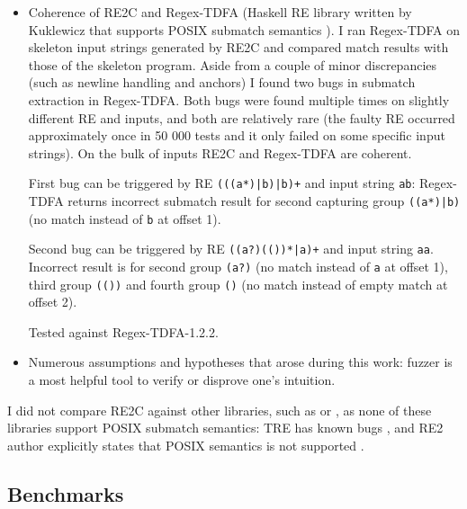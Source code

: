 \documentclass{article}
\theoremstyle{definition}
\begin{document}
\begin{multicols}{2}
\begin{itemize}
    \item Coherence of RE2C and Regex-TDFA (Haskell RE library written by Kuklewicz that supports POSIX submatch semantics \cite{Regex-TDFA}).
        I ran Regex-TDFA on skeleton input strings generated by RE2C and compared match results with those of the skeleton program.
        Aside from a couple of minor discrepancies (such as newline handling and anchors)
        I found two bugs in submatch extraction in Regex-TDFA.
        Both bugs were found multiple times on slightly different RE and inputs,
        and both are relatively rare (the faulty RE occurred approximately once in 50 000 tests
        and it only failed on some specific input strings).
        On the bulk of inputs RE2C and Regex-TDFA are coherent.

        First bug can be triggered by RE \texttt{(((a*)|b)|b)+} and input string \texttt{ab}:
        Regex-TDFA returns incorrect submatch result for second capturing group \texttt{((a*)|b)}
        (no match instead of \texttt{b} at offset 1).

        Second bug can be triggered by RE \texttt{((a?)(())*|a)+} and input string \texttt{aa}.
        Incorrect result is for second group \texttt{(a?)} (no match instead of \texttt{a} at offset 1),
        third group \texttt{(())} and fourth group \texttt{()} (no match instead of empty match at offset 2).

        Tested against Regex-TDFA-1.2.2.

    \item Numerous assumptions and hypotheses that arose during this work:
        fuzzer is a most helpful tool to verify or disprove one's intuition.
    \\
\end{itemize}

I did not compare RE2C against other libraries, such as \cite{TRE} or \cite{RE2},
as none of these libraries support POSIX submatch semantics:
TRE has known bugs \cite{LTU},
and RE2 author explicitly states that POSIX semantics is not supported \cite{Cox17}.

\subsection*{Benchmarks}


\end{multicols}
\end{document}
